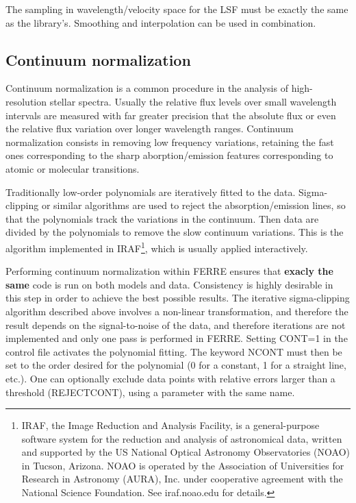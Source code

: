 \documentclass[12pt]{article}
\begin{document}
The sampling in wavelength/velocity space for the LSF must be exactly the same as 
the library's. Smoothing and interpolation can be used in combination.

\subsection{Continuum normalization}

Continuum normalization is a common procedure in the analysis of high-resolution 
stellar spectra. Usually the relative flux levels over small wavelength intervals 
are measured with far greater precision that the absolute flux or even the
relative flux variation over longer wavelength ranges. Continuum normalization 
consists in removing low frequency variations, retaining the fast ones corresponding
to the sharp aborption/emission features corresponding to atomic or molecular transitions.

Traditionally low-order polynomials are iteratively fitted to the data. Sigma-clipping
or similar algorithms are used to reject the absorption/emission lines, so that the 
polynomials track the variations in the continuum. Then data are divided by the polynomials
to remove the slow continuum variations. This is the algorithm implemented in 
IRAF\footnote{IRAF, the Image Reduction and Analysis Facility, is a general-purpose software 
system for the reduction and analysis of astronomical data, written and supported by the US
National Optical Astronomy Observatories (NOAO) in Tucson, Arizona. NOAO is operated by 
the Association of Universities for Research in Astronomy (AURA), Inc. under 
cooperative agreement with the National Science Foundation. See iraf.noao.edu for details.}, 
which is usually applied interactively.

Performing continuum normalization within FERRE ensures that {\bf exacly the same} 
code is run on both models and data.
Consistency is highly desirable in this step in order to achieve the best possible results.
The iterative sigma-clipping algorithm described above involves a non-linear transformation,
and therefore the result depends on the signal-to-noise of the data, and therefore 
iterations are not implemented and only one pass is performed in FERRE. 
Setting CONT=1 in the control file activates the polynomial fitting. The keyword NCONT 
must then be set to the order desired for the polynomial (0 for a constant, 
1 for a straight line, etc.). One can optionally exclude data points with relative errors 
larger than a threshold (REJECTCONT), using a parameter with the same name.
\end{document}
